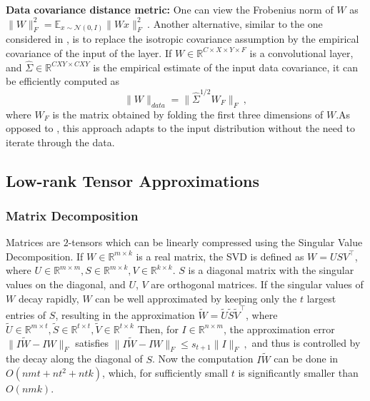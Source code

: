 {\bf Data covariance distance metric: }
One can view the Frobenius norm of $W$ as
$\| W \|_F^2 = \mathbb{E}_{x \sim \mathcal{N}(0,I)} \| W x \|_F^2 ~.$
Another alternative, similar to the one considered in \cite{zisserman14}, is to replace the isotropic covariance
assumption by the empirical covariance of the input of the layer. If $W \in \mathbb{R}^{C \times X \times Y \times F}$ 
is a convolutional layer, and $\widehat{\Sigma} \in \mathbb{R}^{CXY \times CXY}$ is the empirical estimate of the input data covariance, 
it can be efficiently computed as 
\begin{equation}
\| W \|_{data} = \| \widehat{\Sigma}^{1/2} W_F \|_F~, 
\end{equation}
where $W_F$ is the matrix obtained by folding the first three dimensions of $W$.As opposed to \cite{zisserman14}, this
approach adapts to the input distribution without the need to iterate through the data.
\subsection{Low-rank Tensor Approximations}\label{subsec:low_rank}


\subsubsection{Matrix Decomposition}\label{subsubsec:svd}
Matrices are $2$-tensors which can be linearly compressed using the Singular Value Decomposition. 
If $W \in \mathbb{R}^{m \times k}$ is a real matrix, the SVD is defined as
	$W = USV^{\top}$, where $U \in \mathbb{R}^{m \times m}, S \in \mathbb{R}^{m \times k}, V \in \mathbb{R}^{k \times k}$.
$S$ is a diagonal matrix with the singular values on the diagonal, and $U$, $V$ are orthogonal matrices. 
If the singular values of $W$ decay rapidly, $W$ can be well approximated by keeping only the $t$ largest entries of $S$, 
resulting in the approximation 
	$\tilde{W} = \tilde{U}\tilde{S}\tilde{V}^{\top}$, where $\tilde{U} \in \mathbb{R}^{m \times t}, \tilde{S} \in \mathbb{R}^{t \times t}, \tilde{V} \in \mathbb{R}^{t \times k}$
Then, for $I \in \mathbb{R}^{n \times m}$, the approximation error $\| I \tilde{W} - I W \|_F$ satisfies 
  $\| I \tilde{W} - I W \|_F \leq s_{t+1} \| I \|_F~,$
and thus is controlled by the decay along the diagonal of $S$.
Now the computation $I\tilde{W}$ can be done in $O(nmt + nt^2 + ntk)$, which, for sufficiently small $t$ is significantly smaller than $O(nmk)$. 

